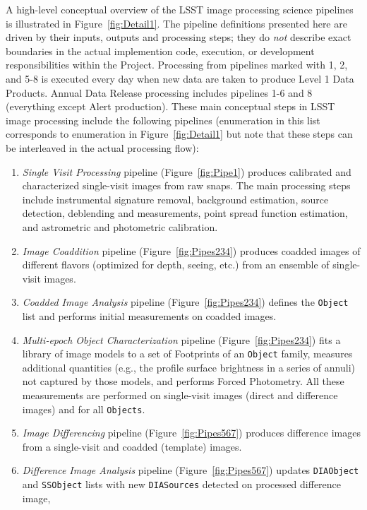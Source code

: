 \documentclass[12pt]{article}
\newcommand{\code}[1]{\texttt{#1}}
\newcommand{\DIASources}{\code{DIASources}\xspace}
\newcommand{\DIAObject}{\code{DIAObject}\xspace}
\newcommand{\Object}{\code{Object}\xspace}
\newcommand{\Objects}{\code{Objects}\xspace}
\newcommand{\SSObject}{\code{SSObject}\xspace}
\begin{document}
A high-level conceptual overview of the LSST image processing science pipelines is illustrated
in Figure~\ref{fig:Detail1}. The pipeline definitions presented here are driven by their inputs,
outputs and processing steps; they do \textit{not} describe exact boundaries in the actual implemention
code, execution, or development responsibilities within the Project.
Processing from pipelines marked with 1, 2, and 5-8 is executed every day when new data are taken
to produce Level 1 Data Products. Annual Data Release processing includes pipelines 1-6 and 8
(everything except Alert production). These main conceptual steps in LSST image processing
include the following pipelines (enumeration in this list corresponds to enumeration in Figure~\ref{fig:Detail1}
but note that these steps can be interleaved in the actual processing flow):
\begin{enumerate}
\item \textit{Single Visit Processing} pipeline (Figure~\ref{fig:Pipe1}) produces calibrated and
characterized single-visit images from raw snaps. The main processing steps include instrumental
signature removal, background estimation, source detection, deblending and measurements,
point spread function estimation, and astrometric and photometric calibration.
\item \textit{Image Coaddition} pipeline (Figure~\ref{fig:Pipes234}) produces coadded images
of different flavors (optimized for depth, seeing, etc.) from an ensemble of single-visit images.
\item \textit{Coadded Image Analysis} pipeline (Figure~\ref{fig:Pipes234}) defines the \Object list
and performs initial measurements on coadded images.
\item \textit{Multi-epoch Object Characterization} pipeline (Figure~\ref{fig:Pipes234}) fits a library
of image models to a set of Footprints of an \Object family, measures additional quantities (e.g.,
the profile surface brightness in a series of annuli) not captured by those models, and performs
Forced Photometry. All these measurements are performed on single-visit images (direct and
difference images) and for all \Objects.
\item \textit{Image Differencing} pipeline (Figure~\ref{fig:Pipes567}) produces difference images
from a single-visit and coadded (template) images.
\item \textit{Difference Image Analysis} pipeline (Figure~\ref{fig:Pipes567}) updates
\DIAObject and \SSObject lists with new \DIASources detected on processed difference image,

\end{enumerate}
\end{document}
